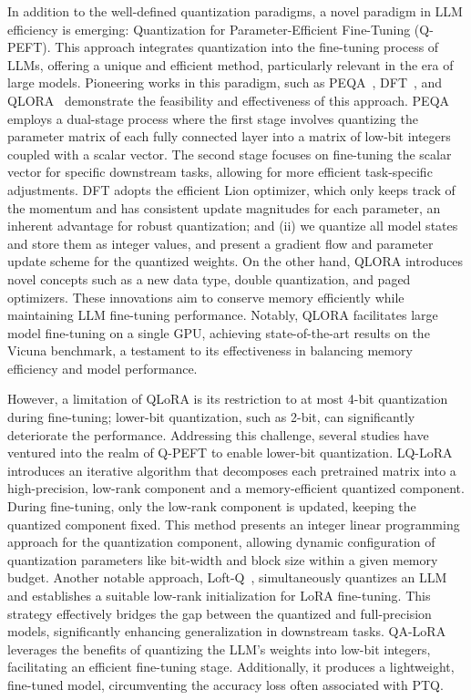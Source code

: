 In addition to the well-defined quantization paradigms, a novel paradigm in LLM efficiency is emerging: Quantization for Parameter-Efficient Fine-Tuning (Q-PEFT).
This approach integrates quantization into the fine-tuning process of LLMs, offering a unique and efficient method, particularly relevant in the era of large models. 
Pioneering works in this paradigm, such as PEQA~\citep{kim2023memory}, DFT~\citep{li2023qft}, and QLORA~\citep{dettmers2023qlora} demonstrate the feasibility and effectiveness of this approach. 
PEQA employs a dual-stage process where the first stage involves quantizing the parameter matrix of each fully connected layer into a matrix of low-bit integers coupled with a scalar vector. The second stage focuses on fine-tuning the scalar vector for specific downstream tasks, allowing for more efficient task-specific adjustments. 
DFT adopts the efficient Lion optimizer, which only keeps track of the momentum and has consistent update magnitudes for each parameter, an inherent advantage for robust quantization; and (ii) we quantize all model states and store them as integer values, and present a gradient flow and parameter update scheme for the quantized weights. 
On the other hand, QLORA introduces novel concepts such as a new data type, double quantization, and paged optimizers. These innovations aim to conserve memory efficiently while maintaining LLM fine-tuning performance. Notably, QLORA facilitates large model fine-tuning on a single GPU, achieving state-of-the-art results on the Vicuna benchmark, a testament to its effectiveness in balancing memory efficiency and model performance.


However, a limitation of QLoRA is its restriction to at most 4-bit quantization during fine-tuning; lower-bit quantization, such as 2-bit, can significantly deteriorate the performance. Addressing this challenge, several studies have ventured into the realm of Q-PEFT to enable lower-bit quantization. LQ-LoRA~\citep{guo2023lq} introduces an iterative algorithm that decomposes each pretrained matrix into a high-precision, low-rank component and a memory-efficient quantized component. During fine-tuning, only the low-rank component is updated, keeping the quantized component fixed. This method presents an integer linear programming approach for the quantization component, allowing dynamic configuration of quantization parameters like bit-width and block size within a given memory budget. Another notable approach, Loft-Q~\citep{li2023loftq}, simultaneously quantizes an LLM and establishes a suitable low-rank initialization for LoRA fine-tuning. This strategy effectively bridges the gap between the quantized and full-precision models, significantly enhancing generalization in downstream tasks. 
QA-LoRA~\citep{xu2023qa} leverages the benefits of quantizing the LLM’s weights into low-bit integers, facilitating an efficient fine-tuning stage. Additionally, it produces a lightweight, fine-tuned model, circumventing the accuracy loss often associated with PTQ.



